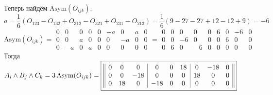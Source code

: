 \documentclass{article}
\newcommand*\squared[1]{\tikz[baseline=(char.base)]{
            \node[shape=rectangle,draw,inner sep=4pt] (char) {#1};}}
\begin{document}
Теперь найдём $\text{Asym}(O_{ijk})$:
$$a = \frac{1}{6}(O_{123} - O_{132} + O_{312} - O_{321} + O_{231} - O_{213}) = \frac{1}{6}(9 - 27 -27 +12 - 12 + 9) = -6$$
$$\text{Asym}(O_{ijk}) = \begin{array}{||ccc|ccc|ccc||}
0 & 0 & 0 & 0 & 0 & -a & 0 & a & 0 \\
0 & 0 & a & 0 & 0 & 0 & -a & 0 & 0 \\
0 & -a & 0 & a & 0 & 0 & 0 & 0 & 0
\end{array} =  \begin{array}{||ccc|ccc|ccc||}
0 & 0 & 0 & 0 & 0 & 6 & 0 & -6 & 0 \\
0 & 0 & -6 & 0 & 0 & 0 & 6 & 0 & 0 \\
0 & 6 & 0 & -6 & 0 & 0 & 0 & 0 & 0
\end{array}$$
Тогда $A_i \wedge B_j \wedge C_k = 3\,\text{Asym}(O_{ijk}) = \squared{$\begin{array}{||ccc|ccc|ccc||}
0 & 0 & 0 & 0 & 0 & 18 & 0 & -18 & 0 \\
0 & 0 & -18 & 0 & 0 & 0 & 18 & 0 & 0 \\
0 & 18 & 0 & -18 & 0 & 0 & 0 & 0 & 0
\end{array}$}$
\end{document}
